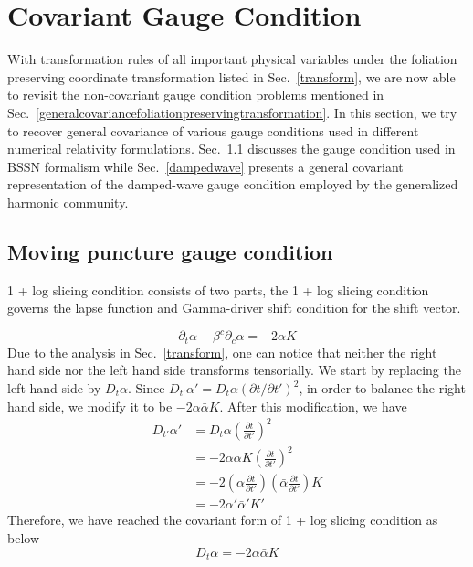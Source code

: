 \section{Covariant Gauge Condition}\label{gauge}
With transformation rules of all important physical variables under the foliation preserving coordinate transformation listed in Sec.~\ref{transform}, we are now able to revisit the non-covariant gauge condition problems mentioned in Sec.~\ref{generalcovariancefoliationpreservingtransformation}. In this section, we try to recover general covariance of various gauge conditions used in different numerical relativity formulations. Sec.~\ref{movingpuncture} discusses the gauge condition used in BSSN formalism while Sec.~\ref{dampedwave} presents a general covariant representation of the damped-wave gauge condition\cite{Pretorius:2006tp, Szilagyi:2009qz, Lindblom:2009tu} employed by the generalized harmonic community. 
\subsection{Moving puncture gauge condition}\label{movingpuncture}
1 + log slicing condition consists of two parts, the 1 + log slicing condition governs the lapse function and Gamma-driver shift condition for the shift vector. 

\begin{equation}\label{1 + log slicing}
\partial_{t}\alpha - \beta^{c}\partial_{c}\alpha = -2\alpha K
\end{equation}
Due to the analysis in Sec.~\ref{transform}, one can notice that neither the right hand side nor the left hand side transforms tensorially. We start by replacing the left hand side by $D_{t}\alpha$. Since $D_{t'}\alpha' = D_{t}\alpha\left(\partial t/\partial t'\right)^{2}$, in order to balance the right hand side, we modify it to be $-2\alpha {\bar \alpha}K$. After this modification, we have
\begin{align*}
D_{t'}\alpha' & = D_{t}\alpha\left(\frac{\partial t}{\partial t'}\right)^{2}\\
& = -2\alpha{\bar \alpha}K\left(\frac{\partial t}{\partial t'}\right)^{2}\\
& = -2\left(\alpha\frac{\partial t}{\partial t'}\right)\left({\bar \alpha}\frac{\partial t}{\partial t'}\right)K\\
& = -2\alpha'{\bar \alpha}'K'
\end{align*}
Therefore, we have reached the covariant form of 1 + log slicing condition as below
\begin{equation}\label{covariant 1 + log slicing}
D_{t}\alpha = -2\alpha{\bar \alpha}K
\end{equation}

